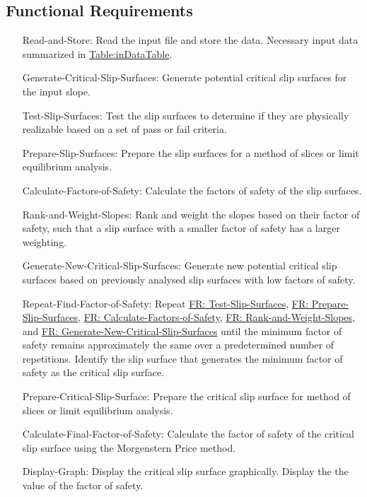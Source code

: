\documentclass[12pt]{article}
\begin{document}
\subsection{Functional Requirements}
\label{Sec:FRs}
\begin{itemize}
\item[Read-and-Store:\phantomsection\label{readAndStore}]Read the input file and store the data. Necessary input data summarized in \hyperref[Table:inDataTable]{Table:inDataTable}.
\item[Generate-Critical-Slip-Surfaces:\phantomsection\label{generateCSS}]Generate potential critical slip surfaces for the input slope.
\item[Test-Slip-Surfaces:\phantomsection\label{testSlipSrf}]Test the slip surfaces to determine if they are physically realizable based on a set of pass or fail criteria.
\item[Prepare-Slip-Surfaces:\phantomsection\label{prepareSlipS}]Prepare the slip surfaces for a method of slices or limit equilibrium analysis.
\item[Calculate-Factors-of-Safety:\phantomsection\label{calculateFS}]Calculate the factors of safety of the slip surfaces.
\item[Rank-and-Weight-Slopes:\phantomsection\label{rankSlope}]Rank and weight the slopes based on their factor of safety, such that a slip surface with a smaller factor of safety has a larger weighting.
\item[Generate-New-Critical-Slip-Surfaces:\phantomsection\label{generateCSS'}]Generate new potential critical slip surfaces based on previously analysed slip surfaces with low factors of safety.
\item[Repeat-Find-Factor-of-Safety:\phantomsection\label{repeatFindFS}]Repeat \hyperref[testSlipSrf]{FR: Test-Slip-Surfaces}, \hyperref[prepareSlipS]{FR: Prepare-Slip-Surfaces}, \hyperref[calculateFS]{FR: Calculate-Factors-of-Safety}, \hyperref[rankSlope]{FR: Rank-and-Weight-Slopes}, and \hyperref[generateCSS']{FR: Generate-New-Critical-Slip-Surfaces} until the minimum factor of safety remains approximately the same over a predetermined number of repetitions. Identify the slip surface that generates the minimum factor of safety as the critical slip surface.
\item[Prepare-Critical-Slip-Surface:\phantomsection\label{prepareCSS}]Prepare the critical slip surface for method of slices or limit equilibrium analysis.
\item[Calculate-Final-Factor-of-Safety:\phantomsection\label{calculateFS'}]Calculate the factor of safety of the critical slip surface using the Morgenstern Price method.
\item[Display-Graph:\phantomsection\label{displayGraph}]Display the critical slip surface graphically. Display the the value of the factor of safety.
\end{itemize}
\end{document}
